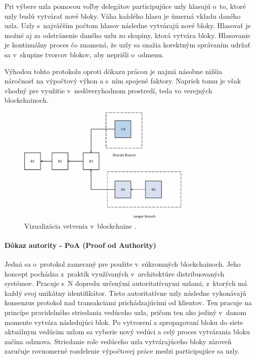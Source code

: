 Pri výbere uzla pomocou voľby delegátov participujúce uzly hlasujú o~to, ktoré uzly budú vytvárať nové bloky. Váha každého hlasu je úmerná vkladu daného uzla. Uzly s~najväčším počtom hlasov následne vytvárajú nové bloky. Hlasovať je možné aj za odstránenie daného uzlu zo skupiny, ktorá vytvára bloky. Hlasovanie je kontinuálny proces čo znamená, že uzly sa snažia korektným správaním udržať sa v~skupine tvorcov blokov, aby neprišli o~odmenu. 

Výhodou tohto protokolu oproti dôkazu prácou je najmä násobne nižšia náročnosť na výpočtový výkon a s~ním spojené faktory. Napriek tomu je však vhodný pre využitie v~nedôveryhodnom prostredí, teda vo verejných blockchainoch.

\begin{figure}[hbt]
	\centering
	\includegraphics[width=0.75\textwidth]{obrazky-figures/block_branch.png}
	\caption{Vizualizácia vetvenia v~blockchaine \cite{blockchain_architecture1}.}
	\label{pic_block_fork}
\end{figure}

\paragraph{Dôkaz autority  - PoA (Proof od Authority)}

Jedná sa o~protokol zameraný pre použite v~súkromných blockchainoch. Jeho koncept pochádza z~praktík využívaných v~architektúre distribuovaných systémov. Pracuje s~N dopredu určenými autoritatívnymi uzlami, z~ktorých má každý svoj unikátny identifikátor. Tieto autoritatívne uzly následne vykonávajú konsenzus protokol nad transakciami prichádzajúcimi od klientov. Ten pracuje na princípe pravidelného striedania vedúceho uzla, pričom ten ako jediný v~danom momente vytvára následujúci blok. Po vytvorení a spropagovaní bloku do siete aktuálnym vedúcim uzlom sa vyberie nový vedúci a celý proces vytvárania bloku začína odznova. Striedanie role vedúceho uzla vytvárajúceho bloky zároveň zaručuje rovnomerné rozdelenie výpočtovej práce medzi participujúce sa uzly.

